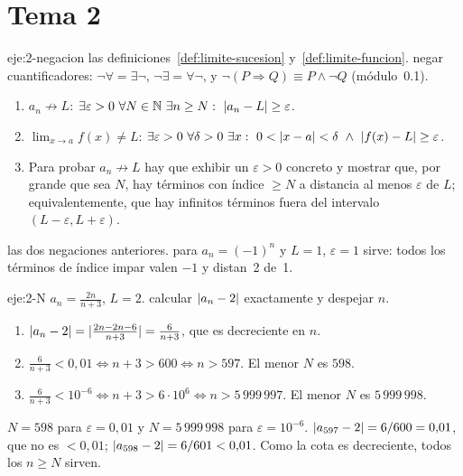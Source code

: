 \section{Tema 2}

\begin{solucion}{eje:2-negacion}
\datos las definiciones~\ref{def:limite-sucesion} y~\ref{def:limite-funcion}.
\planteamiento negar cuantificadores: $\neg\forall=\exists\neg$, $\neg\exists=\forall\neg$, y $\neg(P\Rightarrow Q)\equiv P\wedge\neg Q$ (módulo~0.1).
\pasos
\begin{enumerate}[label=\arabic*.]
  \item $a_n\not\to L$: $\exists\varepsilon>0\ \forall N\in\N\ \exists n\ge N:\ \abs{a_n-L}\ge\varepsilon$.
  \item $\lim_{x\to a}f(x)\ne L$: $\exists\varepsilon>0\ \forall\delta>0\ \exists x:\ 0<\abs{x-a}<\delta\ \wedge\ \abs{f(x)-L}\ge\varepsilon$.
  \item Para probar $a_n\not\to L$ hay que exhibir un $\varepsilon>0$ concreto y mostrar que, por grande que sea $N$, hay términos con índice $\ge N$ a distancia al menos $\varepsilon$ de $L$; equivalentemente, que hay infinitos términos fuera del intervalo $(L-\varepsilon,L+\varepsilon)$.
\end{enumerate}
\resultado las dos negaciones anteriores.
\comprobacion para $a_n=(-1)^{n}$ y $L=1$, $\varepsilon=1$ sirve: todos los términos de índice impar valen $-1$ y distan~2 de~1.
\end{solucion}

\begin{solucion}{eje:2-N}
\datos $a_n=\frac{2n}{n+3}$, $L=2$.
\planteamiento calcular $\lvert a_n-2\rvert$ exactamente y despejar $n$.
\pasos
\begin{enumerate}[label=\arabic*.]
  \item $\lvert a_n-2\rvert=\lvert\frac{2n-2n-6}{n+3}\rvert=\frac{6}{n+3}$, que es decreciente en $n$.
  \item $\frac{6}{n+3}<0{,}01\iff n+3>600\iff n>597$. El menor $N$ es $598$.
  \item $\frac{6}{n+3}<10^{-6}\iff n+3>6\cdot10^{6}\iff n>5\,999\,997$. El menor $N$ es $5\,999\,998$.
\end{enumerate}
\resultado $N=598$ para $\varepsilon=0{,}01$ y $N=5\,999\,998$ para $\varepsilon=10^{-6}$.
\comprobacion $\lvert a_{597}-2\rvert=6/600=0{,}01$, que no es $<0{,}01$; $\lvert a_{598}-2\rvert=6/601<0{,}01$. Como la cota es decreciente, todos los $n\ge N$ sirven.
\end{solucion}

